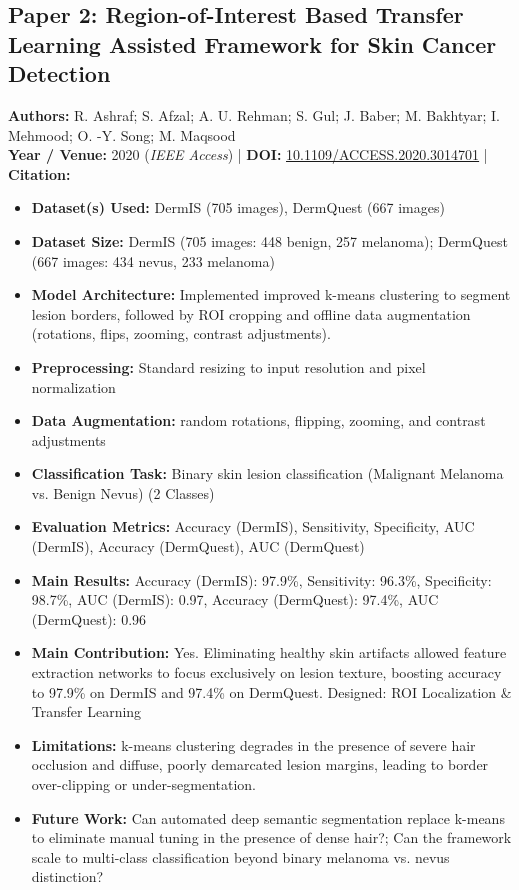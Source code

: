 \documentclass[11pt,a4paper]{article}
\begin{document}
\subsection{Paper 2: Region-of-Interest Based Transfer Learning Assisted Framework for Skin Cancer Detection}
\textbf{Authors:} R. Ashraf; S. Afzal; A. U. Rehman; S. Gul; J. Baber; M. Bakhtyar; I. Mehmood; O. -Y. Song; M. Maqsood \\
\textbf{Year / Venue:} 2020 (\textit{IEEE Access}) | \textbf{DOI:} \href{https://doi.org/10.1109/ACCESS.2020.3014701}{10.1109/ACCESS.2020.3014701} | \textbf{Citation:} \cite{9160933}

\begin{itemize}\small
\item \textbf{Dataset(s) Used:} DermIS (705 images), DermQuest (667 images)
\item \textbf{Dataset Size:} DermIS (705 images: 448 benign, 257 melanoma); DermQuest (667 images: 434 nevus, 233 melanoma)
\item \textbf{Model Architecture:} Implemented improved k-means clustering to segment lesion borders, followed by ROI cropping and offline data augmentation (rotations, flips, zooming, contrast adjustments).
\item \textbf{Preprocessing:} Standard resizing to input resolution and pixel normalization
\item \textbf{Data Augmentation:} random rotations, flipping, zooming, and contrast adjustments
\item \textbf{Classification Task:} Binary skin lesion classification (Malignant Melanoma vs. Benign Nevus) (2 Classes)
\item \textbf{Evaluation Metrics:} Accuracy (DermIS), Sensitivity, Specificity, AUC (DermIS), Accuracy (DermQuest), AUC (DermQuest)
\item \textbf{Main Results:} Accuracy (DermIS): 97.9\%, Sensitivity: 96.3\%, Specificity: 98.7\%, AUC (DermIS): 0.97, Accuracy (DermQuest): 97.4\%, AUC (DermQuest): 0.96
\item \textbf{Main Contribution:} Yes. Eliminating healthy skin artifacts allowed feature extraction networks to focus exclusively on lesion texture, boosting accuracy to 97.9\% on DermIS and 97.4\% on DermQuest. Designed: ROI Localization \& Transfer Learning
\item \textbf{Limitations:} k-means clustering degrades in the presence of severe hair occlusion and diffuse, poorly demarcated lesion margins, leading to border over-clipping or under-segmentation.
\item \textbf{Future Work:} Can automated deep semantic segmentation replace k-means to eliminate manual tuning in the presence of dense hair?; Can the framework scale to multi-class classification beyond binary melanoma vs. nevus distinction?

\end{itemize}
\end{document}
